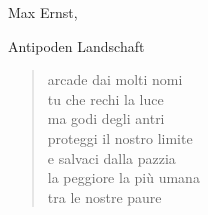 \clearpage


\begin{artItem}
	Max Ernst, \begin{otherlanguage}{german}%
		Antipoden Landschaft%
	\end{otherlanguage}
\end{artItem}

	\begin{verse}
		arcade dai molti nomi\\
		tu che rechi la luce\\
		ma godi degli antri\\
		proteggi il nostro limite\\
		e salvaci dalla pazzia\\
		la peggiore la più umana\\
		tra le nostre paure
	\end{verse}
